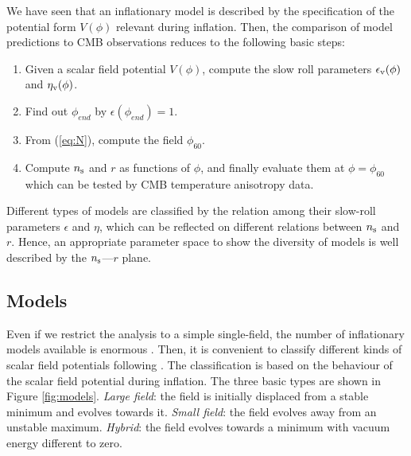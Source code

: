 \documentclass{rmaa}
\begin{document}
We have seen that an inflationary model is described by the specification of the 
potential form $V(\phi)$ relevant during inflation. Then, the comparison of  
model predictions to CMB observations reduces to the following basic steps:
\begin{enumerate}
 \item Given a scalar field potential $V(\phi)$, compute the slow roll parameters $\epsilon_{\rm v}(\phi)$ and
$\eta_{\rm v}(\phi)$. 
\item Find out $\phi_{end}$ by $\epsilon(\phi_{end})=1$. 
\item From (\ref{eq:N}), compute the field $\phi_{60}$.
\item  Compute $n_{\rm s}$ and $r$ as functions of $\phi$, and finally evaluate them at $\phi =
\phi_{60}$ which can be tested by CMB temperature anisotropy data. 
\end{enumerate}


Different types of models are classified by the relation among their slow-roll 
parameters $\epsilon$ and $\eta$, which can be reflected on different relations
 between $n_{\rm s}$ and $r$. Hence, an appropriate parameter space to show the diversity of models 
 is well described by the $n_{\rm s}$---$r$ plane.  



\subsection{Models}


Even if we restrict the analysis to a simple single-field, the number of inflationary models
available is enormous \citep{LiddleLyth, Lyth, Linde05}. Then, it is convenient to classify
different kinds of scalar field potentials following \citep{Kinney2}. 
%
The classification is based on the behaviour of the scalar field potential during inflation.
The three basic types are shown in Figure \ref{fig:models}.
{\em Large field}: the field is initially displaced from a stable minimum and evolves 
towards it. {\em Small field}: the field evolves away from an unstable maximum. 
{\em Hybrid}: the field evolves towards a minimum with vacuum energy different to zero. 
\end{document}
